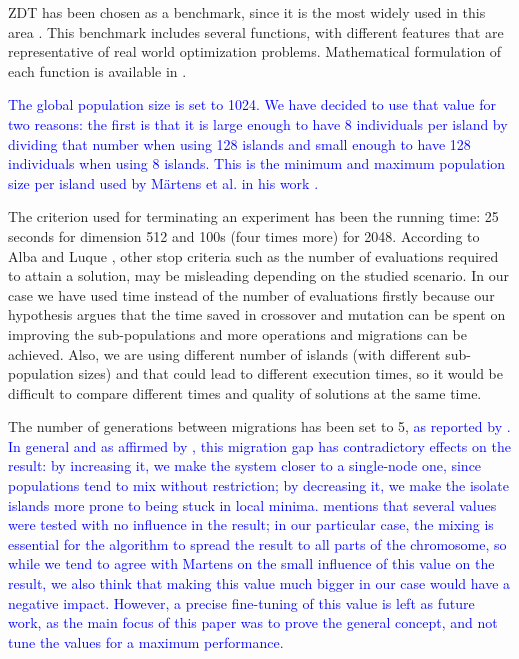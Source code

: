 \documentclass[preprint]{elsarticle}
\begin{document}
ZDT \citep{zdt2000a} has been chosen as a benchmark, since it is the
most widely used in this area
\citep{Deb03distributed,Martens13asynchronous,Wang09parallel,Durillo08masterslave}. This
benchmark includes several functions, with different features that are
representative of real world optimization problems. Mathematical
formulation of each function is available in \citep{zdt2000a}. 


\textcolor{blue}{The global population size is set to 1024. We have decided to use that value for two reasons: the first is that it is large enough to have 8 individuals per island by dividing that number when using 128 islands and small enough to have 128 individuals when using 8 islands. This is the minimum and maximum population size per island used by M{\"a}rtens et al. in his work \cite{Martens13asynchronous}.}


The criterion used for terminating an experiment has been the running
time: 25 seconds for dimension 512 and 100s (four times more) for
2048. According to Alba and Luque \cite{EVALUATIONPARALLEL}, other stop criteria such as the number of evaluations required to attain a solution, may be misleading depending on the studied scenario. In our case we have used time instead of the number of evaluations firstly
because our hypothesis argues that the time saved in crossover and
mutation can be spent on improving the sub-populations and more
operations and migrations can be achieved. Also, we are using
different number of islands (with different sub-population sizes) and that
could lead to different execution times, so it would be difficult to
compare different times and quality of solutions at the same time.

The number of generations between migrations has been set to 5,
\textcolor{blue}{as
reported by \cite{Deb03distributed,Martens13asynchronous}. In general
and as affirmed by 
\cite{cantu1998survey}, this migration gap has contradictory effects
on the result: by increasing it, we make the system closer to a
single-node one, since populations tend to mix without restriction; by
decreasing it, we make the isolate islands more prone to being stuck
in local minima. \cite{Martens13asynchronous} mentions that several
values were tested with no influence in the result; in our particular
case, the mixing is essential for the algorithm to spread the result
to all parts of the chromosome, so while we tend to agree with
Martens on the small influence of this value on the result, we also
think that making this value much bigger in our case would have a
negative impact. However, a precise fine-tuning of this value is left
as future work, as the main focus of this paper was to prove the
general concept, and not tune the values for a maximum performance}.
\end{document}
